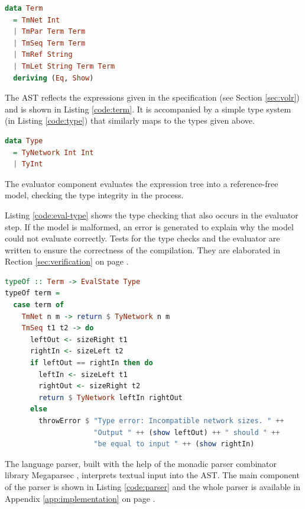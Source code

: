 \lstset{mathescape=false,showstringspaces=false}
\begin{minipage}{\linewidth}
  \begin{lstlisting}[language=haskell, caption={The Volr AST in
  Haskell},label={code:term}]
data Term
  = TmNet Int 
  | TmPar Term Term
  | TmSeq Term Term
  | TmRef String
  | TmLet String Term Term
  deriving (Eq, Show)  
\end{lstlisting}
\end{minipage}

The AST reflects the expressions given in the 
specification (see Section \ref{sec:volr}) and is
shown in Listing \ref{code:term}.
It is accompanied by a simple type system (in Listing \ref{code:type})
that similarly maps to the types given above.

\begin{lstlisting}[language=haskell,label={code:type},caption={Volr type system
in Haskell}]
data Type 
  = TyNetwork Int Int
  | TyInt
\end{lstlisting}

The evaluator component evaluates the expression tree into
a reference-free model, checking the type integrity in the
process.

Listing \ref{code:eval-type} shows the type checking
that also occurs in the evaluator step. 
If the model is malformed, an error is generated to explain why the
model could not evaluate correctly.
Tests for the type checks and the evaluator are written to ensure the
correctness of the compilation.
They are elaborated in Rection \ref{sec:verification} on page
\pageref{sec:verification}.

\begin{lstlisting}[language=Haskell,caption={Part of the type checking code in
Haskell.},label={code:eval-type}]
typeOf :: Term -> EvalState Type
typeOf term = 
  case term of
    TmNet n m -> return $ TyNetwork n m
    TmSeq t1 t2 -> do
      leftOut <- sizeRight t1
      rightIn <- sizeLeft t2
      if leftOut == rightIn then do
        leftIn <- sizeLeft t1
        rightOut <- sizeRight t2
        return $ TyNetwork leftIn rightOut
      else
        throwError $ "Type error: Incompatible network sizes. " ++
                     "Output " ++ (show leftOut) ++ " should " ++
                     "be equal to input " ++ (show rightIn)
\end{lstlisting}

The language parser, built with the help of the monadic parser combinator library Megaparsec
\cite{megaparsec}, interprets textual input into the AST. 
The main component of the parser is shown in Listing \ref{code:parser}
and the whole parser is available in Appendix \ref{app:implementation} on page
\pageref{app:implementation_parser}.

